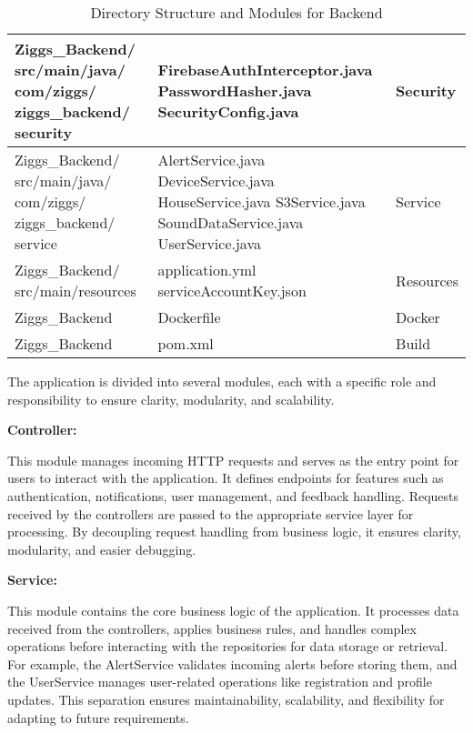 \documentclass[conference]{IEEEtran}
\begin{document}
\begin{table}[H]
\begin{tabular}{|m{2.6cm}|m{3.5cm}|m{1.6cm}|}
Ziggs\_Backend/ src/main/java/ com/ziggs/ ziggs\_backend/ security & 
FirebaseAuthInterceptor.java \newline 
PasswordHasher.java \newline 
SecurityConfig.java & 
Security \\ \hline

Ziggs\_Backend/ src/main/java/ com/ziggs/ ziggs\_backend/ service & 
AlertService.java \newline 
DeviceService.java \newline 
HouseService.java \newline 
S3Service.java \newline 
SoundDataService.java \newline 
UserService.java & 
Service \\ \hline

Ziggs\_Backend/ src/main/resources & 
application.yml \newline 
serviceAccountKey.json & 
Resources \\ \hline

Ziggs\_Backend & 
Dockerfile & 
Docker \\ \hline

Ziggs\_Backend & 
pom.xml & 
Build \\ \hline


\end{tabular}
\caption{Directory Structure and Modules for Backend}
\end{table}


The application is divided into several modules, each with a specific role and responsibility to ensure clarity, modularity, and scalability.

\vspace{0.5cm}

\textbf{Controller:}  

This module manages incoming HTTP requests and serves as the entry point for users to interact with the application. It defines endpoints for features such as authentication, notifications, user management, and feedback handling. Requests received by the controllers are passed to the appropriate service layer for processing. By decoupling request handling from business logic, it ensures clarity, modularity, and easier debugging.

\vspace{0.5cm}

\textbf{Service:}  

This module contains the core business logic of the application. It processes data received from the controllers, applies business rules, and handles complex operations before interacting with the repositories for data storage or retrieval. For example, the AlertService validates incoming alerts before storing them, and the UserService manages user-related operations like registration and profile updates. This separation ensures maintainability, scalability, and flexibility for adapting to future requirements.
\end{document}
